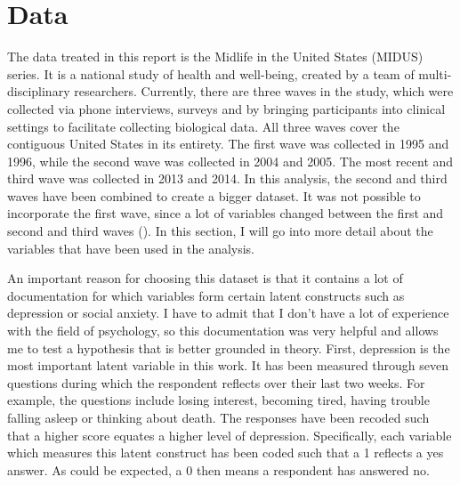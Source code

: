 \documentclass[11pt]{article}
\begin{document}
\section{Data}

The data treated in this report is the Midlife in the United States (MIDUS)
series. It is a national study of health and well-being, created by a team of
multi-disciplinary researchers. Currently, there are three waves in the study,
which were collected via phone interviews, surveys and by bringing participants
into clinical settings to facilitate collecting biological data. All three waves
cover the contiguous United States in its entirety. The first wave was collected
in 1995 and 1996, while the second wave was collected in 2004 and 2005. The most
recent and third wave was collected in 2013 and 2014. In this analysis, the
second and third waves have been combined to create a bigger dataset. It was not
possible to incorporate the first wave, since a lot of variables changed between
the first and second and third waves (\cite{radler2014}). In this section, I
will go into more detail about the variables that have been used in the
analysis.

An important reason for choosing this dataset is that it contains a lot of
documentation for which variables form certain latent constructs such as
depression or social anxiety. I have to admit that I don't have a lot of
experience with the field of psychology, so this documentation was very helpful
and allows me to test a hypothesis that is better grounded in theory. First,
depression is the most important latent variable in this work. It has been
measured through seven questions during which the respondent reflects over their
last two weeks. For example, the questions include losing interest, becoming
tired, having trouble falling asleep or thinking about death. The responses have
been recoded such that a higher score equates a higher level of depression.
Specifically, each variable which measures this latent construct has been coded
such that a 1 reflects a yes answer. As could be expected, a 0 then means a
respondent has answered no.
\end{document}

